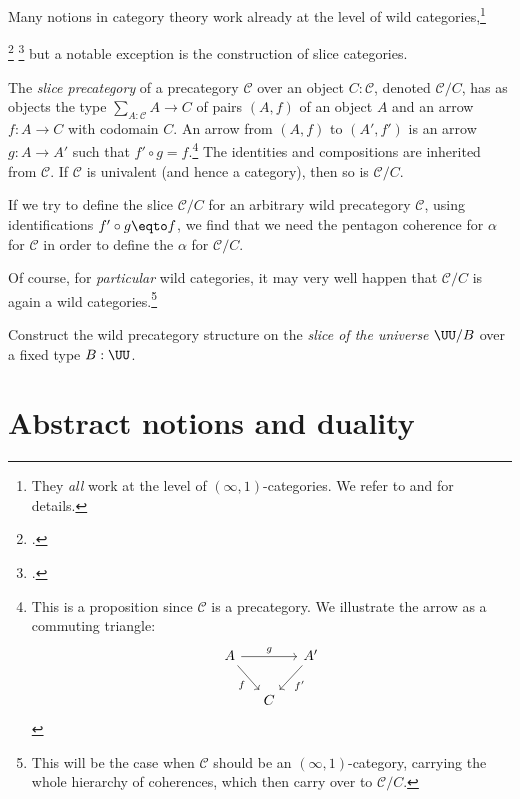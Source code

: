 Many notions in category theory work already at the level of wild categories,\footnote{%
  They \emph{all} work at the level of $(\infty,1)$-categories.
  We refer to \citeauthor{LurieHTT}\footnotemark{} and
  \citeauthor{LandInftyCat}\footnotemark{} for details.}%
\addtocounter{footnote}{-1}\footcitetext{LurieHTT}%
\footcitetext{LandInftyCat}
but a notable exception is the construction of slice categories.
\begin{example}\label{def:slice-cat}
  The \emph{slice precategory} of a precategory $\mathcal C$ over an object $C : \mathcal{C}$,
  denoted $\mathcal C/C$,
  has as objects the type $\sum_{A:\mathcal C}A \to C$ of pairs $(A,f)$ of an object $A$ and an arrow $f:A\to C$
  with codomain $C$.
  An arrow from $(A,f)$ to $(A',f')$ is an arrow $g : A \to A'$ such that $f' \circ g=f$.\footnote{%
    This is a proposition since $\mathcal C$ is a precategory. We illustrate the arrow as
    a commuting triangle:
    \[
      \begin{tikzcd}[ampersand replacement=\&,column sep=small]
        A \ar[dr,"f"']\ar[rr,"g"] \& \& A' \ar[dl,"f'"] \\
        \& C \&
      \end{tikzcd}
    \]}
  The identities and compositions are inherited from $\mathcal C$.
  If $\mathcal C$ is univalent (and hence a category), then so is $\mathcal C/C$.

  If we try to define the slice $\mathcal C/C$ for an arbitrary wild precategory $\mathcal C$,
  using identifications $f' \circ g \eqto f$, we find that we need the pentagon coherence
  for $\alpha$ for $\mathcal C$ in order to define the $\alpha$ for $\mathcal C/C$.

  Of course, for \emph{particular} wild categories, it may very well happen
  that $\mathcal C/C$ is again a wild categories.\footnote{%
    This will be the case when $\mathcal C$ should be an $(\infty,1)$-category,
    carrying the whole hierarchy of coherences, which then
    carry over to $\mathcal C/C$.}
\end{example}
\begin{xca}\label{xca:univ-slice-cat}
  Construct the wild precategory structure on the \emph{slice of the universe} $\UU/B$
  over a fixed type $B:\UU$.
\end{xca}

\section{Abstract notions and duality}
\label{sec:duality}

